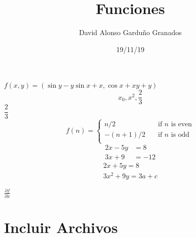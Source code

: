 \documentclass{article}
\title{Funciones}
\author{David Alonso Garduño Granados}
\date{19/11/19}
\begin{document}
	\maketitle
	$ f(x,y)=(\sin y-y \sin x+x, \cos x+x y+y) $
	\[ x_{0}, x^{2}, \frac{2}{3} \]
	\centering $\dfrac{2}{3}$
	\[f(n)=\left\{\begin{array}{ll}n/2 & \quad \mbox{if $n$ is even}\\ -(n+1)/2 & \quad \mbox{if $n$ is odd}\\ \end{array}\right. \]
	\begin{align*}
	2x - 5y &=8\\
	3x +  9 &= -12
	\end{align*}
\begin{gather*}
2x + 5y = 8\\
3x^2 + 9y = 3a + c
\end{gather*}

\begin{flushleft}%
$\frac{\partial f}{\partial x}$
\end{flushleft}

\section*{Incluir Archivos}

\end{document}
